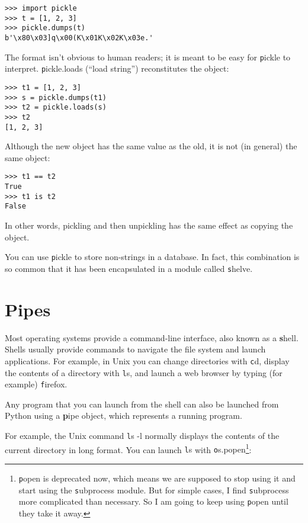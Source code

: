 \documentclass[
DIV=11,
fontsize=12,
twoside,
headinclude=false,
titlepage=firstiscover,
abstract=true,
headsepline=true,
footsepline=true,
chapterprefix=true, %
headings=big,
bibliography=totoc,%
captions=tableheading
]{scrbook}
\theoremstyle{definition}
\begin{document}
\begin{lstlisting}
>>> import pickle
>>> t = [1, 2, 3]
>>> pickle.dumps(t)
b'\x80\x03]q\x00(K\x01K\x02K\x03e.'
\end{lstlisting}
%
The format isn't obvious to human readers; it is meant to be
easy for {\texttt pickle} to interpret.  {\texttt pickle.loads}
(``load string'') reconstitutes the object:

\begin{lstlisting}
>>> t1 = [1, 2, 3]
>>> s = pickle.dumps(t1)
>>> t2 = pickle.loads(s)
>>> t2
[1, 2, 3]
\end{lstlisting}
%
Although the new object has the same value as the old, it is
not (in general) the same object:

\begin{lstlisting}
>>> t1 == t2
True
>>> t1 is t2
False
\end{lstlisting}
%
In other words, pickling and then unpickling has the same effect
as copying the object.

You can use {\texttt pickle} to store non-strings in a database.
In fact, this combination is so common that it has been
encapsulated in a module called {\texttt shelve}.  


\section{Pipes}

Most operating systems provide a command-line interface,
also known as a {\textbf shell}.  Shells usually provide commands
to navigate the file system and launch applications.  For
example, in Unix you can change directories with {\texttt cd},
display the contents of a directory with {\texttt ls}, and launch
a web browser by typing (for example) {\texttt firefox}.

Any program that you can launch from the shell can also be
launched from Python using a {\textbf pipe object}, which
represents a running program.

For example, the Unix command {\texttt ls -l} normally displays the
contents of the current directory in long format.  You can
launch {\texttt ls} with {\texttt os.popen}\footnote{{\texttt popen} is deprecated
now, which means we are supposed to stop using it and start using
the {\texttt subprocess} module.  But for simple cases, I find
{\texttt subprocess} more complicated than necessary.  So I am going
to keep using {\texttt popen} until they take it away.}:
\end{document}
